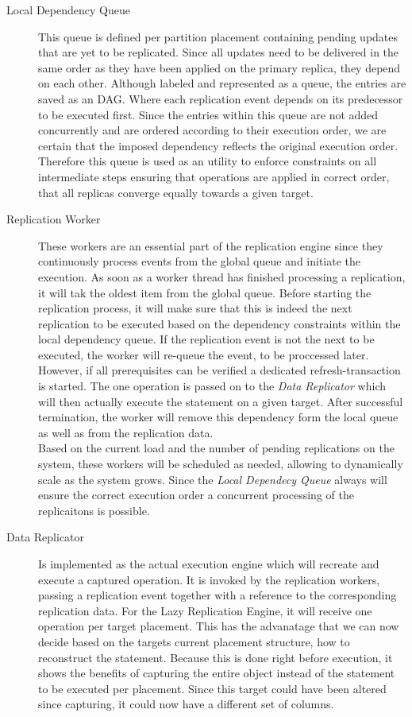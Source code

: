 \begin{description}
  
    \item[Local Dependency Queue] This queue is defined per partition placement containing pending updates that are yet to be replicated. 
    Since all updates need to be delivered in the same order as they have been applied on the primary replica, they depend on each other. 
    Although labeled and represented as a queue, the entries are saved as an DAG. Where each replication event depends on its predecessor to be executed first.
    Since the entries within this queue are not added concurrently and are ordered according to their execution order, we are certain that the imposed dependency
    reflects the original execution order. Therefore this queue is used as an utility to enforce constraints on all intermediate steps ensuring that operations are applied 
    in correct order, that all replicas converge equally towards a given target. 


    \item[Replication Worker] These workers are an essential part of the replication engine since they continuously process events from the global queue 
    and initiate the execution. As soon as a worker thread has finished processing a replication, it will tak the oldest item from the global queue. 
    Before starting the replication process, it will make sure that this is indeed the next replication to be executed based on the dependency constraints
    within the local dependency queue. If the replication event is not the next to be executed, the worker will re-queue the event, to be proccessed later.
    However, if all prerequisites can be verified a dedicated refresh-transaction is started.
    The one operation is passed on to the \emph{Data Replicator} which will then actually execute the statement on a given target.
    After successful termination, the worker will remove this dependency form the local queue as well as from the replication data. \\
    Based on the current load and the number of pending replications on the system, these workers will be scheduled as needed, allowing to dynamically scale as the system grows.
    Since the \emph{Local Dependecy Queue} always will ensure the correct execution order a concurrent processing of the replicaitons is possible.     
    


    \item[Data Replicator] Is implemented as the actual execution engine which will recreate and execute a captured operation. 
    It is invoked by the replication workers, passing a replication event together with a reference to the corresponding replication data.
    For the Lazy Replication Engine, it will receive one operation per target placement. 
    This has the advanatage that we can now decide based on the targets current placement structure, how to reconstruct the statement. 
    Because this is done right before execution, it shows the benefits of capturing the entire object instead of the statement to be executed per placement. 
    Since this target could have been altered since capturing, it could now have a different set of columns.




\end{description}
